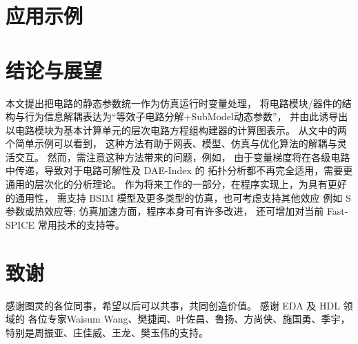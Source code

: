 \documentclass[a4paper,12pt]{ctexart}
\begin{document}
\section{应用示例}\label{sec:applications}


\section{结论与展望}
本文提出把电路的静态参数统一作为仿真运行时变量处理，
将电路模块/器件的结构与行为信息解耦表达为“等效子电路分解+SubModel动态参数”，
并由此诱导出以电路模块为基本计算单元的层次电路方程组构建器的计算图表示。
从文中的两个简单示例可以看到，
这种方法有助于网表、模型、仿真与优化算法的解耦与灵活交互。
然而，需注意这种方法带来的问题，例如，
由于变量梯度将在各级电路中传递，导致对于电路可解性及 DAE-Index 的
拓扑分析都不再完全适用，需要更通用的层次化的分析理论。
作为将来工作的一部分，在程序实现上，为具有更好的通用性，
需支持 BSIM 模型及更多类型的仿真，也可考虑支持其他效应
例如 S 参数或热效应等; 仿真加速方面，程序本身可有许多改进，
还可增加对当前 Fast-SPICE 常用技术的支持等。

\section*{致谢}
感谢图灵的各位同事，希望以后可以共事，共同创造价值。 感谢 EDA 及 HDL 领域的
各位专家Waisum Wang、樊捷闻、叶佐昌、鲁扬、方尚侠、施国勇、季宇，
特别是周振亚、庄佳威、王龙、樊玉伟的支持。




\end{document}
